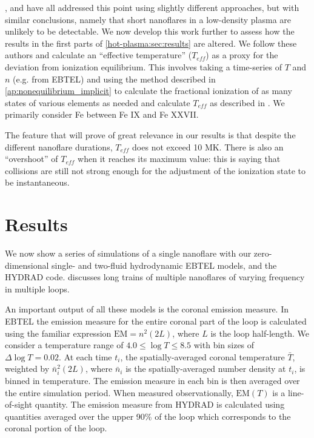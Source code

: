 \citet{bradshaw_explosive_2006}, \citet{reale_nonequilibrium_2008} and \citet{bradshaw_numerical_2009} have all addressed this point using slightly different approaches, but with similar conclusions, namely that short nanoflares in a low-density plasma are unlikely to be detectable. We now develop this work further to assess how the results in the first parts of \autoref{hot-plasma:sec:results} are altered. We follow these authors and calculate an ``effective temperature'' ($T_{eff}$) as a proxy for the deviation from ionization equilibrium. This involves taking a time-series of $T$ and $n$ (e.g. from EBTEL) and using the method described in \autoref{ap:nonequilibrium_implicit} to calculate the fractional ionization of as many states of various elements as needed and calculate $T_{eff}$ as described in \citet{bradshaw_numerical_2009}. We primarily consider Fe between Fe IX and Fe XXVII.

The feature that will prove of great relevance in our results is that despite the different nanoflare durations, $T_{eff}$ does not exceed 10 MK. There is also an ``overshoot'' of $T_{eff}$ when it reaches its maximum value: this is saying that collisions are still not strong enough for the adjustment of the ionization state to be instantaneous.

\section{Results}\label{hot-plasma:sec:results}

We now show a series of simulations of a single nanoflare with our zero-dimensional single- and two-fluid hydrodynamic EBTEL models, and the HYDRAD code.  discusses long trains of multiple nanoflares of varying frequency in multiple loops.

An important output of all these models is the coronal emission measure. In EBTEL the emission measure for the entire coronal part of the loop is calculated using the familiar expression $\mathrm{EM}=n^2(2L)$, where $L$ is the loop half-length. We consider a temperature range of $4.0\le\log{T}\le8.5$ with bin sizes of $\Delta\log{T}=0.02$. At each time $t_i$, the spatially-averaged coronal temperature $\bar{T}$, weighted by $\bar{n}_i^2(2L)$, where $\bar{n}_i$ is the spatially-averaged number density at $t_i$, is binned in temperature. The emission measure in each bin is then averaged over the entire simulation period. When measured observationally, $\mathrm{EM}(T)$ is a line-of-sight quantity. The emission measure from HYDRAD is calculated using quantities averaged over the upper 90\% of the loop which corresponds to the coronal portion of the loop.


